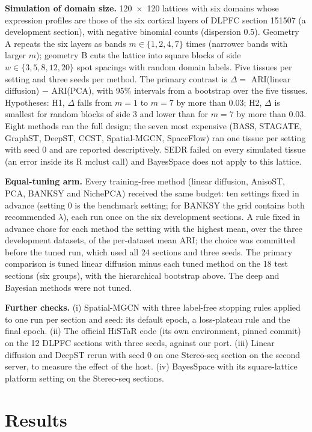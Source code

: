 \documentclass[unnumsec,webpdf,contemporary,large]{oup-authoring-template}
\begin{document}
\textbf{Simulation of domain size.} 120~$\times$~120 lattices with six domains whose expression profiles are those of the six cortical layers
of DLPFC section 151507 (a development section), with negative binomial counts (dispersion 0.5). Geometry A repeats the six layers as bands
$m\in\{1,2,4,7\}$ times (narrower bands with larger $m$); geometry B cuts the lattice into square blocks of side $w\in\{3,5,8,12,20\}$
spot spacings with random domain labels. Five tissues per setting and three seeds per method. The primary contrast is
$\Delta=$ ARI(linear diffusion) $-$ ARI(PCA), with 95\% intervals from a bootstrap over the five tissues. Hypotheses: H1, $\Delta$ falls from
$m=1$ to $m=7$ by more than 0.03; H2, $\Delta$ is smallest for random blocks of side 3 and lower than for $m=7$ by more than 0.03. Eight
methods ran the full design; the seven most expensive (BASS, STAGATE, GraphST, DeepST, CCST, Spatial-MGCN, SpaceFlow) ran one tissue per
setting with seed 0 and are reported descriptively. SEDR failed on every simulated tissue (an error inside its R mclust call) and BayesSpace
does not apply to this lattice.

\textbf{Equal-tuning arm.} Every training-free method (linear diffusion, AnisoST, PCA, BANKSY and NichePCA) received the same budget: ten
settings fixed in advance (setting 0 is the benchmark setting; for BANKSY the grid contains both recommended $\lambda$), each run once on the
six development sections. A rule fixed in advance chose for each method the setting with the highest mean, over the three development
datasets, of the per-dataset mean ARI; the choice was committed before the tuned run, which used all 24 sections and three seeds. The primary
comparison is tuned linear diffusion minus each tuned method on the 18 test sections (six groups), with the hierarchical bootstrap above. The
deep and Bayesian methods were not tuned.

\textbf{Further checks.} (i) Spatial-MGCN with three label-free stopping rules applied to one run per section and seed: its default epoch,
a loss-plateau rule and the final epoch. (ii) The official HiSTaR code (its own environment, pinned commit) on the 12 DLPFC sections with
three seeds, against our port. (iii) Linear diffusion and DeepST rerun with seed 0 on one Stereo-seq section on the second server, to measure
the effect of the host. (iv) BayesSpace with its square-lattice platform setting on the Stereo-seq sections.

\section{Results}
\end{document}

